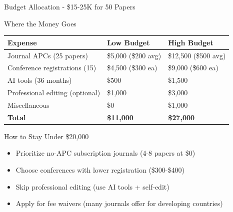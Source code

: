 \documentclass[11pt]{beamer}
\begin{document}
	\begin{frame}{Budget Allocation - \$15-25K for 50 Papers}
		\scriptsize
		\begin{block}{Where the Money Goes}
			\centering
			\begin{tabular}{|p{4cm}|p{3cm}|p{3cm}|}
				\hline
				\textbf{Expense} & \textbf{Low Budget} & \textbf{High Budget} \\
				\hline
				Journal APCs (25 papers) & \$5,000 (\$200 avg) & \$12,500 (\$500 avg) \\
				\hline
				Conference registrations (15) & \$4,500 (\$300 ea) & \$9,000 (\$600 ea) \\
				\hline
				AI tools (36 months) & \$500 & \$1,500 \\
				\hline
				Professional editing (optional) & \$1,000 & \$3,000 \\
				\hline
				Miscellaneous & \$0 & \$1,000 \\
				\hline
				\textbf{Total} & \textbf{\$11,000} & \textbf{\$27,000} \\
				\hline
			\end{tabular}
		\end{block}
		\begin{block}{How to Stay Under \$20,000}
			\begin{itemize}
				\item Prioritize no-APC subscription journals (4-8 papers at \$0)
				\item Choose conferences with lower registration (\$300-\$400)
				\item Skip professional editing (use AI tools + self-edit)
				\item Apply for fee waivers (many journals offer for developing countries)
			\end{itemize}
		\end{block}
	\end{frame}
	
	
	
\end{document}
